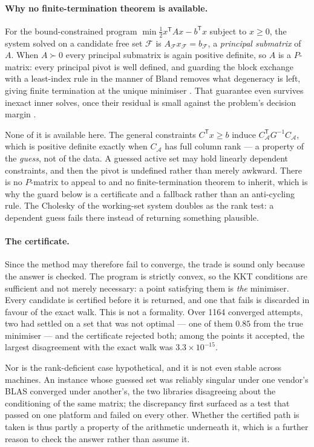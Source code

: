 \documentclass[11pt,a4paper]{article}
\theoremstyle{plain}
\theoremstyle{remark}
\newcommand{\T}{^{\mathsf{T}}}
\begin{document}
\paragraph{Why no finite-termination theorem is available.}
For the bound-constrained program $\min \tfrac12 x\T A x - b\T x$ subject to
$x \ge 0$, the system solved on a candidate free set $\mathcal{F}$ is
$A_\mathcal{F} x_\mathcal{F} = b_\mathcal{F}$, a \emph{principal submatrix} of
$A$. When $A \succ 0$ every principal submatrix is again positive definite, so $A$
is a $P$-matrix: every principal pivot is well defined, and guarding the block
exchange with a least-index rule in the manner of Bland removes what degeneracy is
left, giving finite termination at the unique minimiser
\citep{judice1994,murty1988}. That guarantee even survives inexact inner solves,
once their residual is small against the problem's decision margin
\citep{schmelzer2026}.

None of it is available here. The general constraints $C\T x \ge b$ induce
$C_\mathcal{A}\T G^{-1} C_\mathcal{A}$, which is positive definite exactly when
$C_\mathcal{A}$ has full column rank --- a property of the \emph{guess}, not of
the data. A guessed active set may hold linearly dependent constraints, and then
the pivot is undefined rather than merely awkward. There is no $P$-matrix to
appeal to and no finite-termination theorem to inherit, which is why the guard
below is a certificate and a fallback rather than an anti-cycling rule. The
Cholesky of the working-set system doubles as the rank test: a dependent guess
fails there instead of returning something plausible.

\paragraph{The certificate.}
Since the method may therefore fail to converge, the trade is sound only because
the answer is checked. The program is strictly convex, so the KKT conditions are
sufficient and not merely necessary: a point satisfying them is \emph{the}
minimiser. Every candidate is certified before it is returned, and one that fails
is discarded in favour of the exact walk. This is not a formality. Over 1164
converged attempts, two had settled on a set that was not optimal --- one of them
$0.85$ from the true minimiser --- and the certificate rejected both; among the
points it accepted, the largest disagreement with the exact walk was
$3.3\times10^{-15}$.

Nor is the rank-deficient case hypothetical, and it is not even stable across
machines. An instance whose guessed set was reliably singular under one vendor's
BLAS converged under another's, the two libraries disagreeing about the
conditioning of the same matrix; the discrepancy first surfaced as a test that
passed on one platform and failed on every other. Whether the certified path is
taken is thus partly a property of the arithmetic underneath it, which is a
further reason to check the answer rather than assume it.
\end{document}
